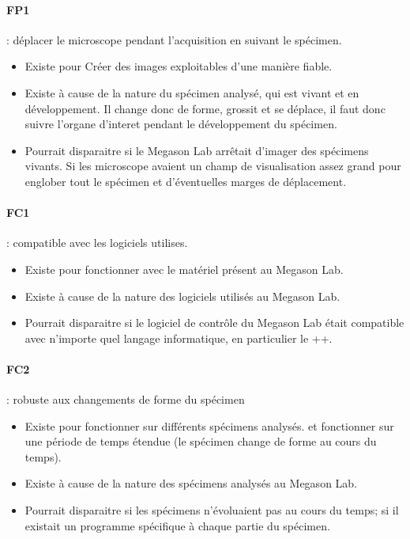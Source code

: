 \paragraph*{FP1} : déplacer le microscope pendant l'acquisition en suivant le spécimen.
\begin{itemize}
  \item Existe pour Créer des images exploitables d'une manière fiable.
  \item Existe à cause de la nature du spécimen analysé, qui est vivant et en développement. 
  Il change donc de forme, grossit et se déplace, il faut donc suivre l'organe d'interet pendant le
  développement du spécimen.
  \item Pourrait disparaitre si le Megason Lab arrêtait d'imager des spécimens vivants.
  Si les microscope avaient un champ de visualisation assez grand pour englober
  tout le spécimen et d'éventuelles marges de déplacement.
\end{itemize}

\paragraph*{FC1} : compatible avec les logiciels utilises.
\begin{itemize}
  \item Existe pour fonctionner avec le matériel présent au Megason Lab.
  \item Existe à cause de la nature des logiciels utilisés au Megason Lab.
  \item Pourrait disparaitre si le logiciel de contrôle du Megason Lab était compatible avec n'importe quel langage informatique,
  en particulier le {\C++}.
\end{itemize}

\paragraph*{FC2} : robuste aux changements de forme du spécimen
\begin{itemize}
  \item Existe pour fonctionner sur différents spécimens analysés.
  et fonctionner sur une période de temps étendue (le spécimen change de forme au cours du temps).
  \item Existe à cause de la nature des spécimens analysés au Megason Lab.
  \item Pourrait disparaitre si les spécimens n'évoluaient pas au cours du temps;
  si il existait un programme spécifique à chaque partie du spécimen.
\end{itemize}

